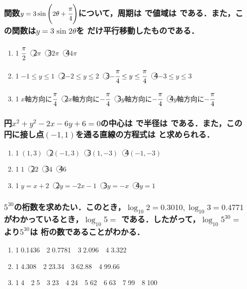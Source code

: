 \documentclass[onecolumn,10pt]{jarticle}
\newcommand{\ctext}[1]{\textcircled{\scriptsize #1}}
\begin{document}
\subsubsection{関数$y=3\sin\left(2\theta+\cfrac{\pi}{4}\right)$について，周期は  で値域は  である．また，この関数は$y=3\sin2\theta$を  だけ平行移動したものである．}
\begin{enumerate}[(1)]
    \item \ctext{1}$\cfrac{\pi}{2}$　\ctext{2}$\pi$　\ctext{3}$2\pi$　\ctext{4}$4\pi$
    \item \ctext{1}$-1\leq y\leq 1$　\ctext{2}$-2\leq y\leq 2$　\ctext{3}$-\cfrac{\pi}{4}\leq y\leq \cfrac{\pi}{4}$　\ctext{4}$-3\leq y\leq 3$
    \item \ctext{1}$x$軸方向に$\cfrac{\pi}{4}$　\ctext{2}$x$軸方向に$-\cfrac{\pi}{4}$　\ctext{3}$y$軸方向に$-\cfrac{\pi}{4}$　\ctext{4}$y$軸方向に$-\cfrac{\pi}{4}$
\end{enumerate}

\subsubsection{円$x^2+y^2-2x-6y+6=0$の中心は  で半径は  である．また，この円に接し点$(-1,1)$を通る直線の方程式は  と求められる．}
\begin{enumerate}[(1)]
    \item \ctext{1}$(1,3)$　\ctext{2}$(-1,3)$　\ctext{3}$(1,-3)$　\ctext{4}$(-1,-3)$
    \item \ctext{1}$1$　\ctext{2}$2$　\ctext{3}$4$　\ctext{4}$6$
    \item \ctext{1}$y=x+2$　\ctext{2}$y=-2x-1$　\ctext{3}$y=-x$　\ctext{4}$y=1$
\end{enumerate}

\subsubsection{$5^{30}$の桁数を求めたい．このとき，$\log_{10}2=0.3010,\log_{10}3=0.4771$がわかっているとき，$\log_{10}5=$  である．したがって，$\log_{10}5^{30}=$  より$5^{30}$は  桁の数であることがわかる．}
\begin{enumerate}[(1)]
    \item \ctext{1}0.1436　\ctext{2}0.7781　\ctext{3}2.096　\ctext{4}3.322
    \item \ctext{1}4.308　\ctext{2}23.34　\ctext{3}62.88　\ctext{4}99.66
    \item \ctext{1}4　\ctext{2}5　\ctext{3}23　\ctext{4}24　\ctext{5}62　\ctext{6}63　\ctext{7}99　\ctext{8}100
\end{enumerate}
\end{document}
